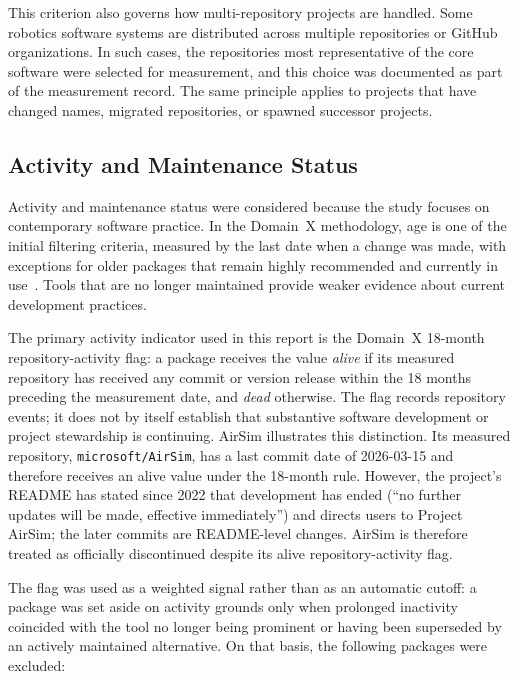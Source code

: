 This criterion also governs how multi-repository projects are handled. Some robotics software systems are distributed across multiple repositories or GitHub organizations. In such cases, the repositories most representative of the core software were selected for measurement, and this choice was documented as part of the measurement record. The same principle applies to projects that have changed names, migrated repositories, or spawned successor projects.

\subsection{Activity and Maintenance Status}
\label{subsec:activity-maintenance-status}

Activity and maintenance status were considered because the study focuses on contemporary software practice. In the Domain~X methodology, age is one of the initial filtering criteria, measured by the last date when a change was made, with exceptions for older packages that remain highly recommended and currently in use~\citep{Smith2021}. Tools that are no longer maintained provide weaker evidence about current development practices.

The primary activity indicator used in this report is the Domain~X 18-month repository-activity flag: a package receives the value \emph{alive} if its measured repository has received any commit or version release within the 18 months preceding the measurement date, and \emph{dead} otherwise. The flag records repository events; it does not by itself establish that substantive software development or project stewardship is continuing. AirSim illustrates this distinction. Its measured repository, \texttt{microsoft/AirSim}, has a last commit date of 2026-03-15 and therefore receives an alive value under the 18-month rule. However, the project's README has stated since 2022 that development has ended (``no further updates will be made, effective immediately'') and directs users to Project AirSim; the later commits are README-level changes. AirSim is therefore treated as officially discontinued despite its alive repository-activity flag.

The flag was used as a weighted signal rather than as an automatic cutoff: a package was set aside on activity grounds only when prolonged inactivity coincided with the tool no longer being prominent or having been superseded by an actively maintained alternative. On that basis, the following packages were excluded:

